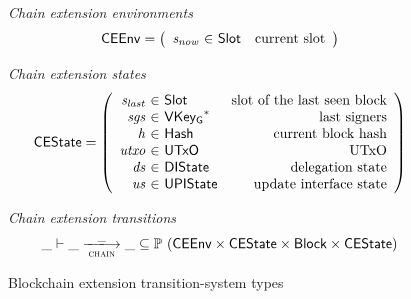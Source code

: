\documentclass[11pt,a4paper]{article}
\newcommand{\powerset}[1]{\mathbb{P}~#1}
\newcommand{\var}[1]{\mathit{#1}}
\newcommand{\type}[1]{\mathsf{#1}}
\newcommand{\trans}[2]{\xlongrightarrow[\textsc{#1}]{#2}}
\newcommand{\seqof}[1]{#1^{*}}
\newcommand{\Hash}{\type{Hash}}  %
\newcommand{\Slot}{\type{Slot}}
\newcommand{\Block}{\type{Block}}
\newcommand{\VKeyGen}{\type{VKey_G}}
\begin{document}
\begin{figure}[ht]
  \emph{Chain extension environments}
  \begin{equation*}
    \CEEnv
    = \left(
      \begin{array}{r@{~\in~}lr}
        \var{s_{now}} & \Slot & \text{current slot}
      \end{array}\right)
  \end{equation*}


  \emph{Chain extension states}
  \begin{equation*}
    \CEState =
    \left(
      \begin{array}{r@{~\in~}lr}
        \var{s_{last}} & \Slot & \text{slot of the last seen block} \\
        \var{sgs} & \seqof{\VKeyGen} & \text{last signers}\\
        \var{h} & \Hash & \text{current block hash} \\
        \var{utxo} & \UTxO & \text{UTxO} \\
        \var{ds} & \DIState & \text{delegation state}\\
        \var{us} & \UPIState & \text{update interface state} \\
      \end{array}
    \right)
  \end{equation*}

  \emph{Chain extension transitions}
  \begin{equation*}
    \_ \vdash \var{\_} \trans{chain}{\_} \var{\_} \subseteq
    \powerset (\CEEnv \times \CEState \times \Block \times \CEState)
  \end{equation*}

  \caption{Blockchain extension transition-system types}
  \label{fig:ts-types:chain-extension}
\end{figure}
\end{document}

